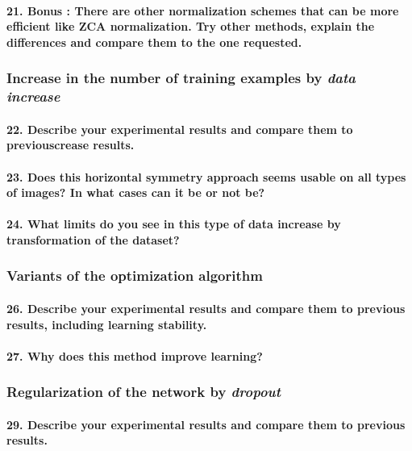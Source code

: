 \documentclass{article}
\theoremstyle{plain}%
\theoremstyle{definition}
\theoremstyle{remark}
\begin{document}
\paragraph{21. Bonus : There are other normalization schemes that can be more efficient like ZCA normalization. Try other methods, explain the differences and compare them to the one requested.}

\subsubsection{Increase in the number of training examples by \textit{data increase}}
\paragraph{22. Describe your experimental results and compare them to previouscrease results.}

\paragraph{23. Does this horizontal symmetry approach seems usable on all types of images? In what cases can it be or not be?}

\paragraph{24. What limits do you see in this type of data increase by transformation of the dataset?}

\subsubsection{Variants of the optimization algorithm}
\paragraph{26. Describe your experimental results and compare them to previous results, including learning stability.}

\paragraph{27. Why does this method improve learning?}


\subsubsection*{Regularization of the network by \textit{dropout}}
\paragraph{29. Describe your experimental results and compare them to previous results.}
\end{document}
